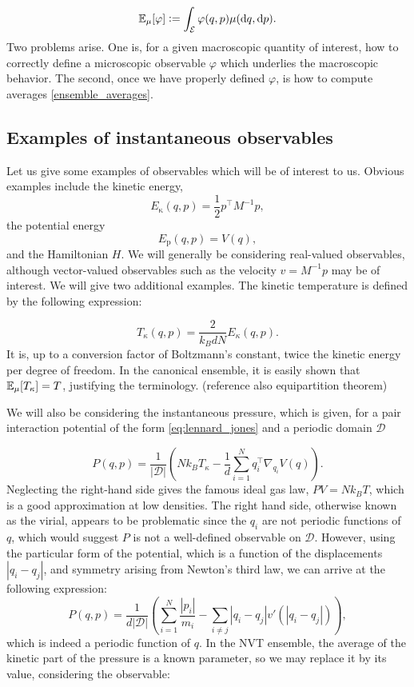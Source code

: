 \begin{equation}
    \label{eq:ensemble_averages}
    \mathbb{E}_\mu[\varphi] \mathrel{\mathop:}= \int_{\mathcal E} \varphi(q,p) \mu(\mathrm{d}q,\mathrm{d}p).
\end{equation}
Two problems arise. One is, for a given macroscopic quantity of interest, how to correctly define a microscopic observable $\varphi$ which underlies the macroscopic behavior. The second, once we have properly defined $\varphi$, is how to compute averages \eqref{ensemble_averages}. 

\subsection{Examples of instantaneous observables}
Let us give some examples of observables which will be of interest to us. Obvious examples include the kinetic energy,
$$ E_{\mathrm \kappa} (q,p) = \frac 12 p^\intercal M^{-1} p,$$
the potential energy
$$ E_{\mathrm p}(q,p)=V(q),$$
and the Hamiltonian $H$. We will generally be considering real-valued observables, although vector-valued observables such as the velocity $v=M^{-1}p$ may be of interest. We will give two additional examples. The kinetic temperature is defined by the following expression:

$$T_\kappa (q,p)= \frac{2}{k_BdN}E_\kappa(q,p).$$
It is, up to a conversion factor of Boltzmann's constant, twice the kinetic energy per degree of freedom. In the canonical ensemble, it is easily shown that $\mathbb{E}_\mu [T_\kappa]=T$, justifying the terminology. (reference also equipartition theorem)

We will also be considering the instantaneous pressure, which is given, for a pair interaction potential of the form \eqref{eq:lennard_jones} and a periodic domain $\mathcal D$

$$P(q,p)=\frac{1}{|\mathcal D|}\left( Nk_B T_{\kappa} -\frac1d\sum_{i=1}^N q_i^\intercal\nabla_{q_i}V(q)\right).$$
Neglecting the right-hand side gives the famous ideal gas law, $PV=Nk_BT$, which is a good approximation at low densities. The right hand side, otherwise known as the virial, appears to be problematic since the $q_i$ are not periodic functions of $q$, which would suggest $P$ is not a well-defined observable on $\mathcal D$.
However, using the particular form of the potential, which is a function of the displacements $|q_i-q_j|$, and symmetry arising from Newton's third law, we can arrive at the following expression:
\begin{equation}\label{eq:pressure}P(q,p)=\frac1{d|\mathcal D|}\left( \sum_{i=1}^N \frac{|p_i|}{m_i}-\sum_{i \neq j}|q_i-q_j|v'(|q_i-q_j|)\right),\end{equation}
which is indeed a periodic function of $q$. In the NVT ensemble, the average of the kinetic part of the pressure is a known parameter, so we may replace it by its value, considering the observable:

